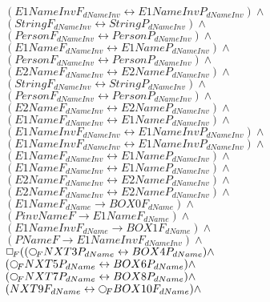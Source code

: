 \documentclass[a4paper,10pt]{article}
\begin{document}
 $ (E1NameInvF_{dNameInv} \leftrightarrow E1NameInvP_{dNameInv}) \land $ \\ 
 $ (StringF_{dNameInv} \leftrightarrow StringP_{dNameInv}) \land $ \\ 
 $ (PersonF_{dNameInv} \leftrightarrow PersonP_{dNameInv}) \land $ \\ 
 $ (E1NameF_{dNameInv} \leftrightarrow E1NameP_{dNameInv}) \land $ \\ 
 $ (PersonF_{dNameInv} \leftrightarrow PersonP_{dNameInv}) \land $ \\ 
 $ (E2NameF_{dNameInv} \leftrightarrow E2NameP_{dNameInv}) \land $ \\ 
 $ (StringF_{dNameInv} \leftrightarrow StringP_{dNameInv}) \land $ \\ 
 $ (PersonF_{dNameInv} \leftrightarrow PersonP_{dNameInv}) \land $ \\ 
 $ (E2NameF_{dNameInv} \leftrightarrow E2NameP_{dNameInv}) \land $ \\ 
 $ (E1NameF_{dNameInv} \leftrightarrow E1NameP_{dNameInv}) \land $ \\ 
 $ (E1NameInvF_{dNameInv} \leftrightarrow E1NameInvP_{dNameInv}) \land $ \\ 
 $ (E1NameInvF_{dNameInv} \leftrightarrow E1NameInvP_{dNameInv}) \land $ \\ 
 $ (E1NameF_{dNameInv} \leftrightarrow E1NameP_{dNameInv}) \land $ \\ 
 $ (E1NameF_{dNameInv} \leftrightarrow E1NameP_{dNameInv}) \land $ \\ 
 $ (E2NameF_{dNameInv} \leftrightarrow E2NameP_{dNameInv}) \land $ \\ 
 $ (E2NameF_{dNameInv} \leftrightarrow E2NameP_{dNameInv}) \land $ \\ 
 $ (E1NameF_{dName} \rightarrow BOX0F_{dName}) \land $ \\ 
 $ (PinvNameF \rightarrow E1NameF_{dName}) \land $ \\ 
 $ (E1NameInvF_{dName} \rightarrow BOX1F_{dName}) \land $ \\ 
 $ (PNameF \rightarrow E1NameInvF_{dNameInv}) \land $ \\ 
 $  \Rbox (( \Rnext NXT3P_{dName} \leftrightarrow BOX4P_{dName}) \land $ \\ 
 $ ( \Rnext NXT5P_{dName} \leftrightarrow BOX6P_{dName}) \land $ \\ 
 $ ( \Rnext NXT7P_{dName} \leftrightarrow BOX8P_{dName}) \land $ \\ 
 $ (NXT9F_{dName} \leftrightarrow  \Rnext BOX10F_{dName}) \land $ \\ 
\end{document}
